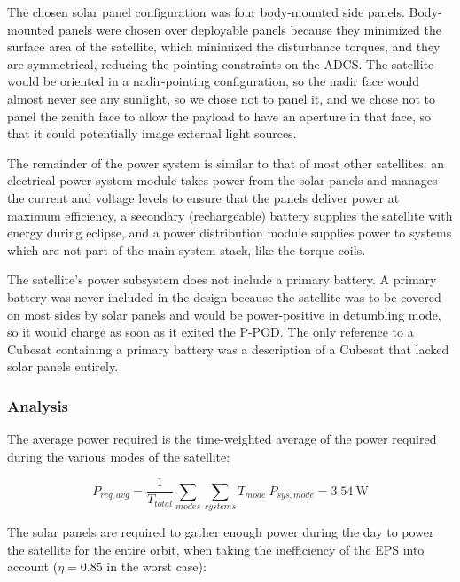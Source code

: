 \documentclass[12pt]{article}
\begin{document}
The chosen solar panel configuration was four body-mounted side panels.  Body-mounted panels were chosen over deployable panels because they minimized the surface area of the satellite, which minimized the disturbance torques, and they are symmetrical, reducing the pointing constraints on the ADCS.  The satellite would be oriented in a nadir-pointing configuration, so the nadir face would almost never see any sunlight, so we chose not to panel it, and we chose not to panel the zenith face to allow the payload to have an aperture in that face, so that it could potentially image external light sources.

The remainder of the power system is similar to that of most other satellites: an electrical power system module takes power from the solar panels and manages the current and voltage levels to ensure that the panels deliver power at maximum efficiency, a secondary (rechargeable) battery supplies the satellite with energy during eclipse, and a power distribution module supplies power to systems which are not part of the main system stack, like the torque coils.

The satellite's power subsystem does not include a primary battery.  A primary battery was never included in the design because the satellite was to be covered on most sides by solar panels and would be power-positive in detumbling mode, so it would charge as soon as it exited the P-POD.  The only reference to a Cubesat containing a primary battery was a description of a Cubesat that lacked solar panels entirely.\cite{libertad-1}
			
			\subsubsection{Analysis}\label{subsubsec:power-analysis}
			
The average power required is the time-weighted average of the power required during the various modes of the satellite:

\begin{equation}
P_{req,avg} = \frac{1}{T_{total}}\sum_{modes}{ \sum_{systems}{T_{mode} \: P_{sys,mode}} } = 3.54 \ \text{W} 
\label{eq:power-required}
\end{equation}

The solar panels are required to gather enough power during the day to power the satellite for the entire orbit, when taking the inefficiency of the EPS into account ($\eta = 0.85$ in the worst case\cite{EPS manual}):
\end{document}
